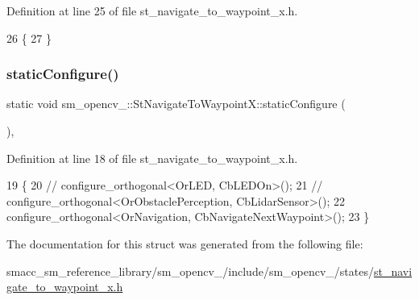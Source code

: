 Definition at line 25 of file st\+\_\+navigate\+\_\+to\+\_\+waypoint\+\_\+x.\+h.


\begin{DoxyCode}
26         \{
27         \}
\end{DoxyCode}
\mbox{\label{structsm__opencv__2_1_1StNavigateToWaypointX_a01b7fd830bf0aa7fda963d1492edf7c3}} 
\subsubsection{\texorpdfstring{static\+Configure()}{staticConfigure()}}
{\footnotesize\ttfamily static void sm\+\_\+opencv\+\_\+::\+St\+Navigate\+To\+Waypoint\+X\+::static\+Configure (\begin{DoxyParamCaption}{ }\end{DoxyParamCaption})\hspace{0.3cm}{\ttfamily [inline]}, {\ttfamily [static]}}



Definition at line 18 of file st\+\_\+navigate\+\_\+to\+\_\+waypoint\+\_\+x.\+h.


\begin{DoxyCode}
19         \{
20             \textcolor{comment}{// configure\_orthogonal<OrLED, CbLEDOn>();}
21             \textcolor{comment}{// configure\_orthogonal<OrObstaclePerception, CbLidarSensor>();}
22             configure\_orthogonal<OrNavigation, CbNavigateNextWaypoint>();
23         \}
\end{DoxyCode}


The documentation for this struct was generated from the following file\+:\begin{DoxyCompactItemize}
\item 
smacc\+\_\+sm\+\_\+reference\+\_\+library/sm\+\_\+opencv\+\_/include/sm\+\_\+opencv\+\_/states/\hyperlink{2_2include_2sm__opencv__2_2states_2st__navigate__to__waypoint__x_8h}{st\+\_\+navigate\+\_\+to\+\_\+waypoint\+\_\+x.\+h}\end{DoxyCompactItemize}
